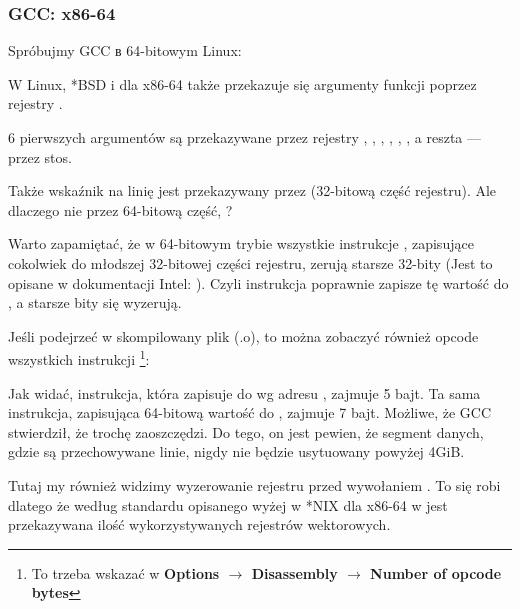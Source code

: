\subsubsection{GCC: x86-64}

Spróbujmy GCC в 64-bitowym Linux:



W Linux, *BSD i \MacOSX dla x86-64 także przekazuje się argumenty funkcji poprzez rejestry \SysVABI.

6 pierwszych argumentów są przekazywane przez rejestry \RDI, \RSI, \RDX, \RCX, , , a reszta --- przez stos.

Także wskaźnik na linię jest przekazywany przez \EDI (32-bitową część rejestru).
Ale dlaczego nie przez 64-bitową część, \RDI?

Warto zapamiętać, że w 64-bitowym trybie wszystkie instrukcje \MOV, zapisujące cokolwiek do młodszej 32-bitowej części rejestru, zerują starsze 32-bity (Jest to opisane w dokumentacji Intel: ).
Czyli instrukcja  poprawnie zapisze tę wartość do \RAX, a starsze bity się wyzerują.

Jeśli podejrzeć w \IDA skompilowany plik (.o), to można zobaczyć również opcode wszystkich instrukcji
\footnote{To trzeba wskazać w \textbf{Options $\rightarrow$ Disassembly $\rightarrow$ Number of opcode bytes}}:



\label{hw_EDI_instead_of_RDI}
Jak widać, instrukcja, która zapisuje do \EDI wg adresu , zajmuje 5 bajt.
Ta sama instrukcja, zapisująca 64-bitową wartość do \RDI, zajmuje 7 bajt.
Możliwe, że GCC stwierdził, że trochę zaoszczędzi.
Do tego, on jest pewien, że segment danych, gdzie są przechowywane linie, nigdy nie będzie usytuowany powyżej 4\gls{GiB}.

\label{SysVABI_input_EAX}
Tutaj my również widzimy wyzerowanie rejestru \EAX przed wywołaniem \printf.
To się robi dlatego że według standardu opisanego wyżej w *NIX dla x86-64 w \EAX jest przekazywana ilość wykorzystywanych rejestrów wektorowych.


